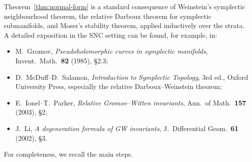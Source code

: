\documentclass[11pt]{article}
\theoremstyle{definition}
\numberwithin{equation}{section}
\begin{document}
Theorem~\ref{thm:normal-form} is a standard consequence of Weinstein's symplectic neighbourhood theorem, the relative Darboux theorem for symplectic submanifolds, and Moser's stability theorem, applied inductively over the strata.  A detailed exposition in the SNC setting can be found, for example, in:
\begin{itemize}
\item M.~Gromov, \emph{Pseudoholomorphic curves in symplectic manifolds}, Invent.\ Math.\ \textbf{82} (1985), \S 2.3;
\item D.~McDuff--D.~Salamon, \emph{Introduction to Symplectic Topology}, 3rd ed., Oxford University Press, especially the relative Darboux--Weinstein theorem;
\item E.~Ionel--T.~Parker, \emph{Relative Gromov--Witten invariants}, Ann.\ of Math.\ \textbf{157} (2003), \S 2;
\item J.~Li, \emph{A degeneration formula of GW invariants}, J.\ Differential Geom.\ \textbf{61} (2002), \S 3.
\end{itemize}
For completeness, we recall the main steps.
\end{document}
